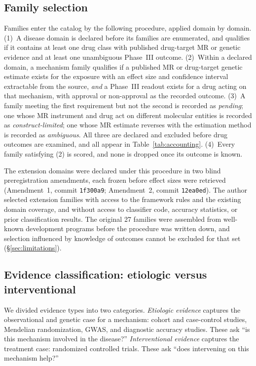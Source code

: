 \documentclass[11pt]{article}
\begin{document}
\subsection{Family selection}
\label{sec:selection}

Families enter the catalog by the following procedure, applied domain by domain.
(1)~A disease domain is declared before its families are enumerated, and qualifies if
it contains at least one drug class with published drug-target MR or genetic evidence
and at least one unambiguous Phase~III outcome.
(2)~Within a declared domain, a mechanism family qualifies if a published MR or
drug-target genetic estimate exists for the exposure with an effect size and confidence
interval extractable from the source, \emph{and} a Phase~III readout exists for a drug
acting on that mechanism, with approval or non-approval as the recorded outcome.
(3)~A family meeting the first requirement but not the second is recorded as
\emph{pending}; one whose MR instrument and drug act on different molecular entities is
recorded as \emph{construct-limited}; one whose MR estimate reverses with the estimation
method is recorded as \emph{ambiguous}. All three are declared and excluded before drug
outcomes are examined, and all appear in Table~\ref{tab:accounting}.
(4)~Every family satisfying (2) is scored, and none is dropped once its outcome is known.

The extension domains were declared under this procedure in two blind preregistration
amendments, each frozen before effect sizes were retrieved (Amendment~1, commit
\texttt{1f300a9}; Amendment~2, commit \texttt{12ea0ed}). The author selected extension
families with access to the framework rules and the existing domain coverage, and
without access to classifier code, accuracy statistics, or prior classification results.
The original 27 families were assembled from well-known development programs before the
procedure was written down, and selection influenced by knowledge of outcomes cannot be
excluded for that set (\S\ref{sec:limitations}).

\subsection{Evidence classification: etiologic versus interventional}

We divided evidence types into two categories. \emph{Etiologic evidence} captures the observational and genetic case for a mechanism: cohort and case-control studies, Mendelian randomization, GWAS, and diagnostic accuracy studies. These ask ``is this mechanism involved in the disease?'' \emph{Interventional evidence} captures the treatment case: randomized controlled trials. These ask ``does intervening on this mechanism help?''
\end{document}
